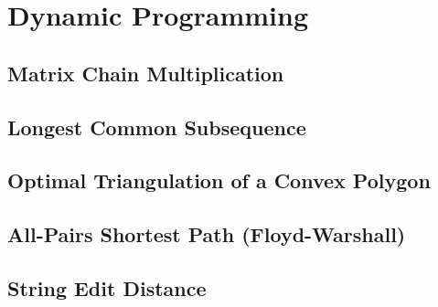 \chapter{Dynamic Programming}

\section{Matrix Chain Multiplication}

\section{Longest Common Subsequence}

\section{Optimal Triangulation of a Convex Polygon}

\hypertarget{sec:floyd_warshall}{\section{All-Pairs Shortest Path (Floyd-Warshall)}}

\section{String Edit Distance}

